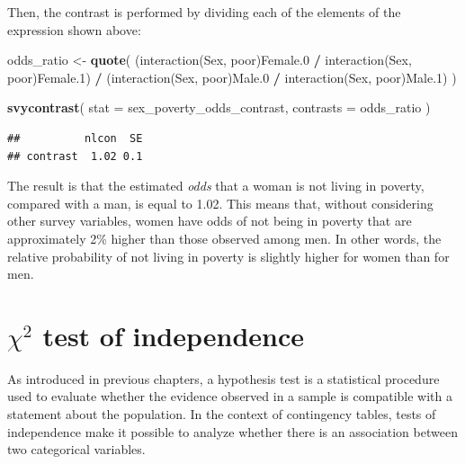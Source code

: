 \documentclass[
  english,
  12pt,
]{book}
\newenvironment{Shaded}{\begin{snugshade}}{\end{snugshade}}
\newcommand{\AttributeTok}[1]{\textcolor[rgb]{0.13,0.29,0.53}{#1}}
\newcommand{\FunctionTok}[1]{\textcolor[rgb]{0.13,0.29,0.53}{\textbf{#1}}}
\newcommand{\NormalTok}[1]{#1}
\newcommand{\OtherTok}[1]{\textcolor[rgb]{0.56,0.35,0.01}{#1}}
\newcommand{\SpecialCharTok}[1]{\textcolor[rgb]{0.81,0.36,0.00}{\textbf{#1}}}
\newcommand{\StringTok}[1]{\textcolor[rgb]{0.31,0.60,0.02}{#1}}
\begin{document}
Then, the contrast is performed by dividing each of the elements of the expression shown above:

\begin{Shaded}
\begin{Highlighting}[]
\NormalTok{odds\_ratio }\OtherTok{\textless{}{-}} \FunctionTok{quote}\NormalTok{(}
\NormalTok{ (}\StringTok{\textasciigrave{}}\AttributeTok{interaction(Sex, poor)Female.0}\StringTok{\textasciigrave{}} \SpecialCharTok{/}
  \StringTok{\textasciigrave{}}\AttributeTok{interaction(Sex, poor)Female.1}\StringTok{\textasciigrave{}}\NormalTok{) }\SpecialCharTok{/}
\NormalTok{ (}\StringTok{\textasciigrave{}}\AttributeTok{interaction(Sex, poor)Male.0}\StringTok{\textasciigrave{}} \SpecialCharTok{/}
  \StringTok{\textasciigrave{}}\AttributeTok{interaction(Sex, poor)Male.1}\StringTok{\textasciigrave{}}\NormalTok{)}
\NormalTok{)}

\FunctionTok{svycontrast}\NormalTok{(}
  \AttributeTok{stat =}\NormalTok{ sex\_poverty\_odds\_contrast,}
  \AttributeTok{contrasts =}\NormalTok{ odds\_ratio}
\NormalTok{)}
\end{Highlighting}
\end{Shaded}

\begin{verbatim}
##          nlcon  SE
## contrast  1.02 0.1
\end{verbatim}

The result is that the estimated \emph{odds} that a woman is not living in poverty, compared with a man, is equal to 1.02. This means that, without considering other survey variables, women have odds of not being in poverty that are approximately 2\% higher than those observed among men. In other words, the relative probability of not living in poverty is slightly higher for women than for men.

\section{\texorpdfstring{\(\chi^{2}\) test of independence}{\textbackslash chi\^{}\{2\} test of independence}}\label{prueba-de-independencia-chi}

As introduced in previous chapters, a hypothesis test is a statistical procedure used to evaluate whether the evidence observed in a sample is compatible with a statement about the population. In the context of contingency tables, tests of independence make it possible to analyze whether there is an association between two categorical variables.
\end{document}

